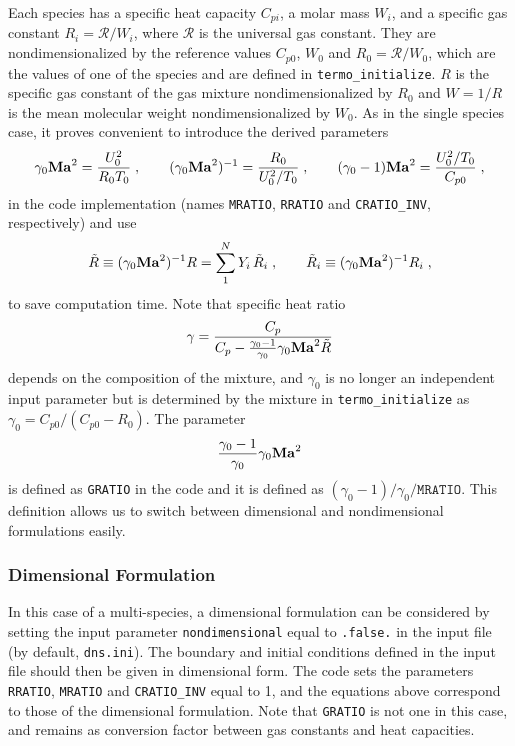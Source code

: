 Each species has a specific heat capacity $C_{pi}$, a molar mass $W_i$, and a specific gas constant $R_i=\mathcal{R}/W_i$, where  $\mathcal{R}$ is the universal gas constant. They are nondimensionalized by the reference values $C_{p0}$, $W_0$ and $R_0=\mathcal{R}/W_0$, which are the values of one of the species and are defined in \texttt{termo\_initialize}. $R$ is the specific gas constant of the gas mixture nondimensionalized by $R_0$ and $W=1/R$ is the mean molecular weight nondimensionalized by $W_0$. As in the single species case, it proves convenient to introduce the derived parameters
\begin{equation}
    \gamma_0\mathrm{\bf Ma}^2=\frac{U_0^2}{R_0T_0}\;,\qquad (\gamma_0\mathrm{\bf Ma}^2)^{-1}=\frac{R_0}{U^2_0/T_0}\;,\qquad (\gamma_0-1)\mathrm{\bf Ma}^2 =\frac{U_0^2/T_0}{C_{p0}} \;,
\end{equation}
in the code implementation (names \texttt{MRATIO}, \texttt{RRATIO} and \texttt{CRATIO\_INV}, respectively) and use 
\begin{equation}
    \tilde{R}\equiv (\gamma_0\mathrm{\bf Ma}^2)^{-1}R=\sum_1^NY_i\,\tilde{R}_i\;,\qquad\tilde{R}_i\equiv (\gamma_0\mathrm{\bf Ma}^2)^{-1}R_i
    \;,
\end{equation}
to save computation time. Note that specific heat ratio
\begin{equation}
    \gamma=\frac{C_p}{C_p-\frac{\gamma_0-1}{\gamma_0}\gamma_0\mathrm{\bf Ma}^2\tilde{R}}
\end{equation}
depends on the composition of the mixture, and $\gamma_0$ is no longer an independent input parameter but is determined by the mixture in \texttt{termo\_initialize} as $\gamma_0=C_{p0}/(C_{p0}-R_0)$. The parameter
\begin{equation}
    \frac{\gamma_0-1}{\gamma_0}\gamma_0\mathrm{\bf Ma}^2
\end{equation}
is defined as \texttt{GRATIO} in the code and it is defined as $(\gamma_0-1)/\gamma_0/\texttt{MRATIO}$. This definition allows us to switch between dimensional and nondimensional formulations easily.


\subsubsection{Dimensional Formulation}

In this case of a multi-species, a dimensional formulation can be considered by setting the input parameter \texttt{nondimensional} equal to \texttt{.false.} in the input file (by default, \texttt{dns.ini}). The boundary and initial conditions defined in the input file should then be given in dimensional form. The code sets the parameters \texttt{RRATIO}, \texttt{MRATIO} and \texttt{CRATIO\_INV} equal to 1, and the equations above correspond to those of the dimensional formulation. Note that \texttt{GRATIO} is not one in this case, and remains as conversion factor between gas constants and heat capacities.


